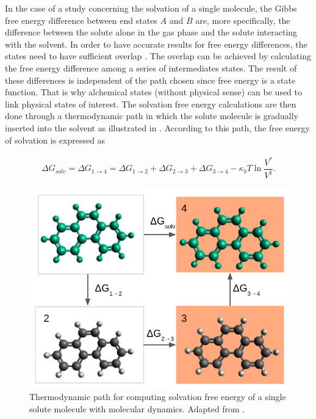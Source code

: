 In the case of a study concerning the solvation of a single molecule, the Gibbs free energy difference between end states $A$ and $B$ are, more specifically, the difference between the solute alone in the gas phase and the solute interacting with the solvent. In order to have accurate results for free energy differences, the states need to have sufficient overlap  \cite{klimovich}. The overlap can be achieved by calculating the free energy difference among a series of intermediates states. The result of these differences is independent of the path chosen since free energy is a state function. That is why alchemical states (without physical sense) can be used to link physical states of interest. The solvation free energy calculations are then done through a thermodynamic path in which the solute molecule is gradually inserted into the solvent as illustrated in . According to this path, the free energy of solvation is expressed as

\begin{equation}
\label{eq:freesolv}
\begin{aligned}
\Delta G_{solv} = \Delta G_{1 \rightarrow 4} = \Delta G_{1 \rightarrow 2} + \Delta G_{2 \rightarrow 3} + \Delta G_{3 \rightarrow 4}  - \kappa_{b}T \ln \dfrac{V^{*}}{V^{1}} .
\end{aligned}
\end{equation}

\begin{figure}[th]
	\centering
	\includegraphics[scale=0.6]{Figures/cicclotermo}
	\caption{Thermodynamic path for computing solvation free energy of a single solute molecule with molecular dynamics. Adapted from .}
	\label{thermcy}
\end{figure}

